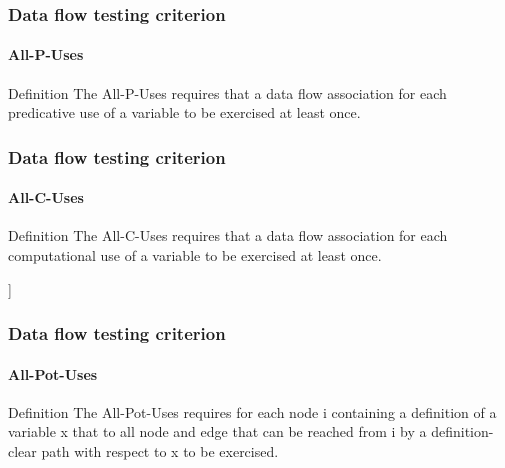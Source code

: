 \begin{frame}
\label{concept:all-p-uses}
\label{concept:all-p-uses-criterion}
\frametitle{Data flow testing criterion}
\framesubtitle{All-P-Uses}

\begin{block:concept}{Definition}
The All-P-Uses requires that a data flow association for each predicative
use of a variable to be exercised at least once.
\end{block:concept}
\end{frame}



\begin{frame}
\label{concept:all-c-uses}
\label{concept:all-c-uses-criterion}
\frametitle{Data flow testing criterion}
\framesubtitle{All-C-Uses}

\begin{block:concept}{Definition}
The All-C-Uses requires that a data flow association for each computational
use of a variable to be exercised at least once.
\end{block:concept}
\end{frame}



\begin{frame}[hasnext=false,hasprev=true]]
\label{concept:all-pot-uses}
\label{concept:all-pot-uses-criterion}
\frametitle{Data flow testing criterion}
\framesubtitle{All-Pot-Uses}

\begin{block:concept}{Definition}
The All-Pot-Uses requires for each node i containing a definition of
a variable x that to all node and edge that can be reached from i by a
definition-clear path with respect to x to be exercised.
\end{block:concept}

\hfill
{}
\end{frame}